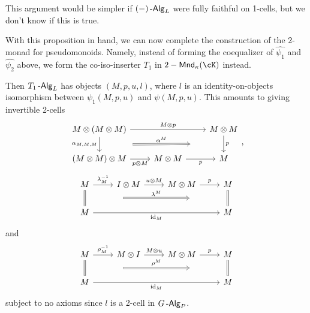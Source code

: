 \documentclass[a4paper,11pt,oneside,openany]{scrbook}
\begin{document}
\begin{rmk}
    This argument would be simpler if $(-)\operatorname{-\mathsf{Alg}}_L$ were fully faithful on
    1-cells, but we don't know if this is true.
\end{rmk}

With this proposition in hand, we can now complete the construction of the
2-monad for pseudomonoids. Namely, instead of forming the coequalizer of
$\hat{\psi_1}$ and $\hat{\psi_2}$ above, we form the co-iso-inserter $T_1$ in
$2-\Mnd_\kappa(\cK)$ instead.

Then $T_1\operatorname{-\mathsf{Alg}}_L$ has objects $(M,p,u,l)$, where $l$ is an identity-on-objects
isomorphism between $\psi_1(M,p,u)$ and $\psi(M,p,u)$. This amounts to giving
invertible 2-cells
\[\begin{tikzcd}
	{M\otimes(M\otimes M)} && {M\otimes M} \\
	{(M\otimes M)\otimes M} & {M\otimes M} & M
	\arrow["{M\otimes p}", from=1-1, to=1-3]
	\arrow[""{name=0, anchor=center, inner sep=0}, "p", from=1-3, to=2-3]
	\arrow["p"', from=2-2, to=2-3]
	\arrow["{p\otimes M}"', from=2-1, to=2-2]
	\arrow[""{name=1, anchor=center, inner sep=0}, "{\alpha_{M,M,M}}"', from=1-1, to=2-1]
	\arrow["{\alpha^M}", shorten <=39pt, shorten >=39pt, Rightarrow, from=1, to=0]
\end{tikzcd},\]
\[\begin{tikzcd}
	M & {I\otimes M} & {M\otimes M} & M \\
	M &&& M
	\arrow["{\id_M}"', from=2-1, to=2-4]
	\arrow[""{name=0, anchor=center, inner sep=0}, Rightarrow, no head, from=1-4, to=2-4]
	\arrow[""{name=1, anchor=center, inner sep=0}, Rightarrow, no head, from=1-1, to=2-1]
	\arrow["{\lambda_M^{-1}}", from=1-1, to=1-2]
	\arrow["{u\otimes M}", from=1-2, to=1-3]
	\arrow["p", from=1-3, to=1-4]
	\arrow["{\lambda^M}", shorten <=45pt, shorten >=45pt, Rightarrow, from=1, to=0]
\end{tikzcd}\]
and
\[\begin{tikzcd}
	M & {M\otimes I} & {M\otimes M} & M \\
	M &&& M
	\arrow["{\id_M}"', from=2-1, to=2-4]
	\arrow[""{name=0, anchor=center, inner sep=0}, Rightarrow, no head, from=1-4, to=2-4]
	\arrow[""{name=1, anchor=center, inner sep=0}, Rightarrow, no head, from=1-1, to=2-1]
	\arrow["{\rho_M^{-1}}", from=1-1, to=1-2]
	\arrow["{M\otimes u}", from=1-2, to=1-3]
	\arrow["p", from=1-3, to=1-4]
	\arrow["{\rho^M}", shorten <=45pt, shorten >=45pt, Rightarrow, from=1, to=0]
\end{tikzcd}\]
subject to no axioms since $l$ is a 2-cell in $G\operatorname{-\mathsf{Alg}}_P$.
\end{document}

